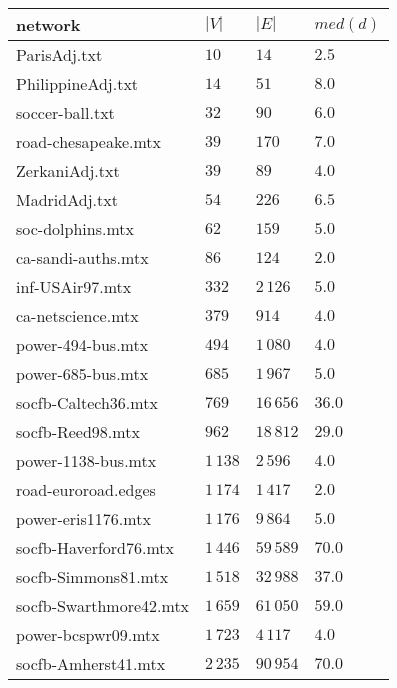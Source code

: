 \begin{tabular}{llll}
\toprule
                network &         $|V|$ &         $|E|$ & $med(d)$ \\
\midrule
           ParisAdj.txt &          $10$ &          $14$ &    $2.5$ \\
      PhilippineAdj.txt &          $14$ &          $51$ &    $8.0$ \\
        soccer-ball.txt &          $32$ &          $90$ &    $6.0$ \\
    road-chesapeake.mtx &          $39$ &         $170$ &    $7.0$ \\
         ZerkaniAdj.txt &          $39$ &          $89$ &    $4.0$ \\
          MadridAdj.txt &          $54$ &         $226$ &    $6.5$ \\
       soc-dolphins.mtx &          $62$ &         $159$ &    $5.0$ \\
     ca-sandi-auths.mtx &          $86$ &         $124$ &    $2.0$ \\
        inf-USAir97.mtx &         $332$ &      $2\,126$ &    $5.0$ \\
      ca-netscience.mtx &         $379$ &         $914$ &    $4.0$ \\
      power-494-bus.mtx &         $494$ &      $1\,080$ &    $4.0$ \\
      power-685-bus.mtx &         $685$ &      $1\,967$ &    $5.0$ \\
    socfb-Caltech36.mtx &         $769$ &     $16\,656$ &   $36.0$ \\
       socfb-Reed98.mtx &         $962$ &     $18\,812$ &   $29.0$ \\
     power-1138-bus.mtx &      $1\,138$ &      $2\,596$ &    $4.0$ \\
    road-euroroad.edges &      $1\,174$ &      $1\,417$ &    $2.0$ \\
     power-eris1176.mtx &      $1\,176$ &      $9\,864$ &    $5.0$ \\
  socfb-Haverford76.mtx &      $1\,446$ &     $59\,589$ &   $70.0$ \\
    socfb-Simmons81.mtx &      $1\,518$ &     $32\,988$ &   $37.0$ \\
 socfb-Swarthmore42.mtx &      $1\,659$ &     $61\,050$ &   $59.0$ \\
     power-bcspwr09.mtx &      $1\,723$ &      $4\,117$ &    $4.0$ \\
    socfb-Amherst41.mtx &      $2\,235$ &     $90\,954$ &   $70.0$ \\

\end{tabular}
